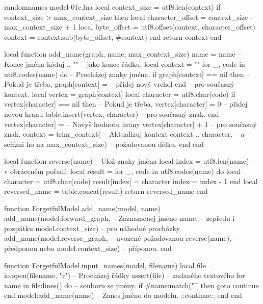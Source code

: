 \documentclass{csbulletin}
\begin{document}
\begin{filecontents}{randomnames-model-01e.lua}
  local context_size = utf8.len(context)
  if context_size > max_context_size then
    local character_offset = context_size - max_context_size + 1
    local byte_offset = utf8.offset(context, character_offset)
    context = context:sub(byte_offset, #context)
  end
  return context
end

local function add_name(graph, name, max_context_size)
  name = name                            -- Konec jména kóduj
       .. "\n"                           -- jako konec řádku.
  local context = ""
  for _, code in utf8.codes(name) do     -- Procházej znaky jména.
    if graph[context] == nil then        -- Pokud je třeba,
      graph[context] = {}                -- přidej nový vrchol
    end                                  -- pro současný kontext.
    local vertex = graph[context]
    local character = utf8.char(code)
    if vertex[character] == nil then     -- Pokud je třeba,
      vertex[character] = 0              -- přidej novou hranu
      table.insert(vertex, character)    -- pro současný znak.
    end
    vertex[character] =                  -- Navyš hodnotu hrany
      vertex[character] + 1              -- pro současný znak.
    context = trim_context(              -- Aktualizuj kontext
      context .. character,              -- a seřízni ho na
      max_context_size)                  -- požadovanou délku.
  end
end

local function reverse(name)             -- Ulož znaky jména
  local index = utf8.len(name)           -- v obráceném pořadí.
  local result = {}
  for _, code in utf8.codes(name) do
    local character = utf8.char(code)
    result[index] = character
    index = index - 1
  end
  local reversed_name = table.concat(result)
  return reversed_name
end

function ForgetfulModel.add_name(model, name)
  add_name(model.forward_graph,          -- Zaznamenej jméno
           name,                         -- zepředu i pozpátku
           model.context_size)           -- pro náhodné procházky
  add_name(model.reverse_graph,          -- uvozené požadovanou
           reverse(name),                -- předponou nebo
           model.context_size)           -- příponou.
end

function ForgetfulModel.input_names(model, filename)
  local file = io.open(filename, "r")    -- Procházej řádky
  assert(file)                           -- zadaného textového
  for name in file:lines() do            -- souboru se jmény.
    if #name:match("^%
      then goto continue end
    model:add_name(name)                 -- Zanes jméno do modelu.
    ::continue::
  end
end
\end{filecontents}
\end{document}
